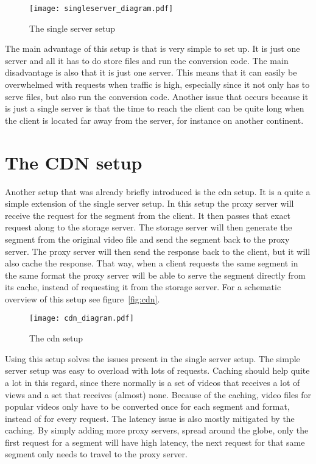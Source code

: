 \documentclass[twoside,openright]{uva-bachelor-thesis}
\begin{document}
\begin{figure}[h]
    \texttt{[image: singleserver\_diagram.pdf]}
    \caption{The single server setup}\label{fig:singleserver}
\end{figure}

The main advantage of this setup is that is very simple to set up. It is just
one server and all it has to do store files and run the conversion code. The
main disadvantage is also that it is just one server. This means that it can
easily be overwhelmed with requests when traffic is high, especially since it
not only has to serve files, but also run the conversion code. Another issue
that occurs because it is just a single server is that the time to reach the
client can be quite long when the client is located far away from the server,
for instance on another continent.



\section{The CDN setup}
Another setup that was already briefly introduced is the \gls{cdn} setup. It is
a quite a simple extension of the single server setup. In this setup the proxy
server will receive the request for the segment from the client. It then passes
that exact request along to the storage server. The storage server will then
generate the segment from the original video file and send the segment back to
the proxy server.  The proxy server will then send the response back to the
client, but it will also cache the response. That way, when a client requests
the same segment in the same format the proxy server will be able to serve the
segment directly from its cache, instead of requesting it from the storage
server. For a schematic overview of this setup see figure~\vref{fig:cdn}.

\begin{figure}[h]
    \texttt{[image: cdn\_diagram.pdf]}
    \caption{The \gls{cdn} setup}\label{fig:cdn}
\end{figure}

Using this setup solves the issues present in the single server
setup. The simple server setup was easy to overload with lots of requests.
Caching should help quite a lot in this regard, since there normally is a set of
videos that receives a lot of views and a set that receives (almost) none.
Because of the caching, video files for popular videos only have to be converted
once for each segment and format, instead of for every request.  The latency
issue is also mostly mitigated by the caching. By simply adding more proxy
servers, spread around the globe, only the first request for a segment will have
high latency, the next request for that same segment only needs to travel to the
proxy server.
\end{document}
